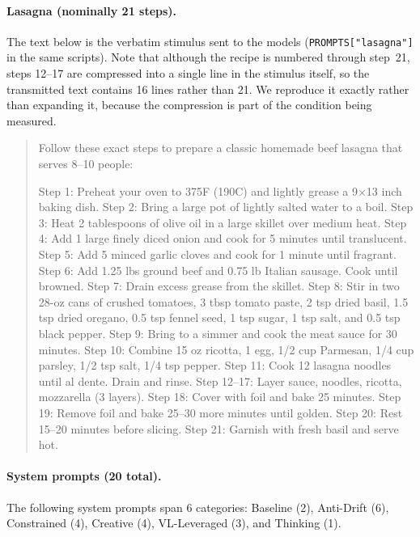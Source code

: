 \documentclass[11pt]{article}
\begin{document}
\paragraph{Lasagna (nominally 21 steps).}
The text below is the verbatim stimulus sent to the models
(\texttt{PROMPTS["lasagna"]} in the same scripts). Note that
although the recipe is numbered through step~21, steps 12--17 are compressed
into a single line in the stimulus itself, so the transmitted text contains
16 lines rather than 21. We reproduce it exactly rather than expanding it,
because the compression is part of the condition being measured.
\begin{quote}
\small
Follow these exact steps to prepare a classic homemade beef lasagna that serves
8--10 people:

Step 1: Preheat your oven to 375\textdegree F (190\textdegree C) and lightly
grease a 9$\times$13 inch baking dish.
Step 2: Bring a large pot of lightly salted water to a boil.
Step 3: Heat 2 tablespoons of olive oil in a large skillet over medium heat.
Step 4: Add 1 large finely diced onion and cook for 5 minutes until translucent.
Step 5: Add 5 minced garlic cloves and cook for 1 minute until fragrant.
Step 6: Add 1.25 lbs ground beef and 0.75 lb Italian sausage. Cook until browned.
Step 7: Drain excess grease from the skillet.
Step 8: Stir in two 28-oz cans of crushed tomatoes, 3 tbsp tomato paste, 2 tsp
dried basil, 1.5 tsp dried oregano, 0.5 tsp fennel seed, 1 tsp sugar, 1 tsp salt,
and 0.5 tsp black pepper.
Step 9: Bring to a simmer and cook the meat sauce for 30 minutes.
Step 10: Combine 15 oz ricotta, 1 egg, 1/2 cup Parmesan, 1/4 cup parsley,
1/2 tsp salt, 1/4 tsp pepper.
Step 11: Cook 12 lasagna noodles until al dente. Drain and rinse.
Step 12--17: Layer sauce, noodles, ricotta, mozzarella (3 layers).
Step 18: Cover with foil and bake 25 minutes.
Step 19: Remove foil and bake 25--30 more minutes until golden.
Step 20: Rest 15--20 minutes before slicing.
Step 21: Garnish with fresh basil and serve hot.
\end{quote}

\paragraph{System prompts (20 total).}
The following system prompts span 6 categories: Baseline (2), Anti-Drift (6),
Constrained (4), Creative (4), VL-Leveraged (3), and Thinking (1).
\end{document}

